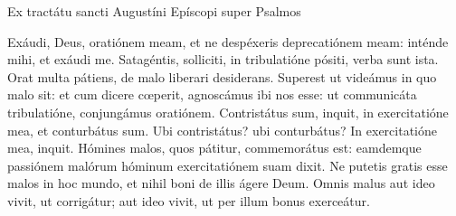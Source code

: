 
Ex tractátu sancti Augustíni Epíscopi super Psalmos

Exáudi, Deus, oratiónem meam, et ne despéxeris deprecatiónem meam: inténde mihi, 
et exáudi me. Satagéntis, solliciti, in tribulatióne pósiti, verba sunt ista. 
Orat multa pátiens, de malo liberari desiderans. 
Superest ut videámus in quo malo sit: et cum dicere cœperit, 
agnoscámus ibi nos esse: ut communicáta tribulatióne, conjungámus oratiónem. 
Contristátus sum, inquit, in exercitatióne mea, et conturbátus sum. 
Ubi contristátus? ubi conturbátus? In exercitatióne mea, inquit. 
Hómines malos, quos pátitur, commemorátus est: 
eamdemque passiónem malórum hóminum exercitatiónem suam dixit. 
Ne putetis gratis esse malos in hoc mundo, et nihil boni de illis ágere Deum. 
Omnis malus aut ideo vivit, ut corrigátur; aut ideo vivit, ut per illum bonus exerceátur.
\par